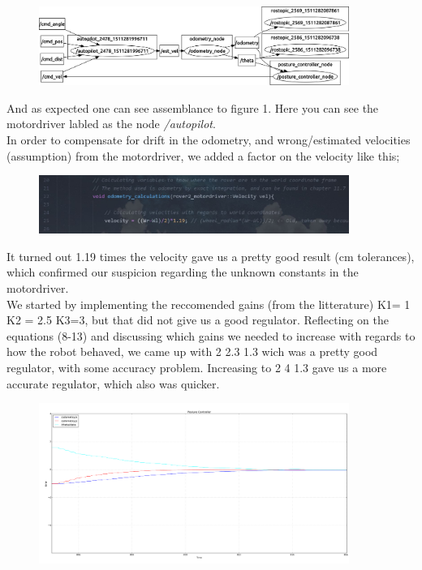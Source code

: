 \documentclass[a4paper,10pt]{article}
\begin{document}
		\begin{figure}[H]
		\centering
		\includegraphics[width=0.9\textwidth]{rover2_rqt_graph.png}
		\end{figure}

		And as expected one can see assemblance to figure 1. Here you can see the motordriver labled as the node \textit{/autopilot}. \\


		In order to compensate for drift in the odometry, and wrong/estimated velocities (assumption) from the motordriver, we added a factor on the velocity like this;
		\begin{figure}[H]
		\centering
		\includegraphics[width=0.9\textwidth]{snippet_adjustment_factor.JPG}
		\end{figure}
		It turned out 1.19 times the velocity gave us a pretty good result (cm tolerances), which confirmed our suspicion regarding the unknown constants in the motordriver.\\

		We started by implementing the reccomended gains (from the litterature) K1= 1 K2 = 2.5 K3=3, but that did not give us a good regulator.
		Reflecting on the equations (8-13) and discussing which gains we needed to increase with regards to how the robot behaved, we came up with 2 2.3 1.3 wich was a pretty good regulator, with some accuracy problem. Increasing to 2 4 1.3 gave us a more accurate regulator, which also was quicker.

		\begin{figure}[H]
		\centering
		\includegraphics[width=0.9\textwidth]{rover2_rqt_plot94_2413.png}
		\end{figure}				 
	
\end{document}
